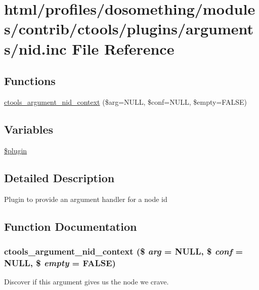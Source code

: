 \hypertarget{nid_8inc}{
\section{html/profiles/dosomething/modules/contrib/ctools/plugins/arguments/nid.inc File Reference}
\label{nid_8inc}
}
\subsection*{Functions}
\begin{DoxyCompactItemize}
\item 
\hyperlink{nid_8inc_af25777102bc88ac8137925249b8120f4}{ctools\_\-argument\_\-nid\_\-context} (\$arg=NULL, \$conf=NULL, \$empty=FALSE)
\end{DoxyCompactItemize}
\subsection*{Variables}
\begin{DoxyCompactItemize}
\item 
\hyperlink{nid_8inc_ada8a7130088351710bb02ed622d6bf65}{\$plugin}
\end{DoxyCompactItemize}


\subsection{Detailed Description}
Plugin to provide an argument handler for a node id 

\subsection{Function Documentation}
\hypertarget{nid_8inc_af25777102bc88ac8137925249b8120f4}{
\subsubsection[{ctools\_\-argument\_\-nid\_\-context}]{\setlength{\rightskip}{0pt plus 5cm}ctools\_\-argument\_\-nid\_\-context (\$ {\em arg} = {\ttfamily NULL}, \/  \$ {\em conf} = {\ttfamily NULL}, \/  \$ {\em empty} = {\ttfamily FALSE})}}
\label{nid_8inc_af25777102bc88ac8137925249b8120f4}
Discover if this argument gives us the node we crave. 

